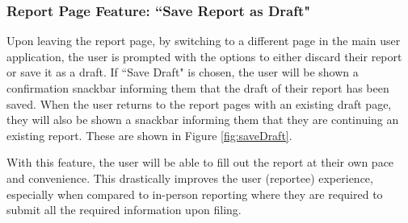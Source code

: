 \subsubsection{Report Page Feature: ``Save Report as Draft"}
Upon leaving the report page, by switching to a different page in the main user application, the user is prompted with the options to either discard their report or save it as a draft. If ``Save Draft" is chosen, the user will be shown a confirmation snackbar informing them that the draft of their report has been saved. When the user returns to the report pages with an existing draft page, they will also be shown a snackbar informing them that they are continuing an existing report. These are shown in Figure \ref{fig:saveDraft}.

With this feature, the user will be able to fill out the report at their own pace and convenience. This drastically improves the user (reportee) experience, especially when compared to in-person reporting where they are required to submit all the required information upon filing.
